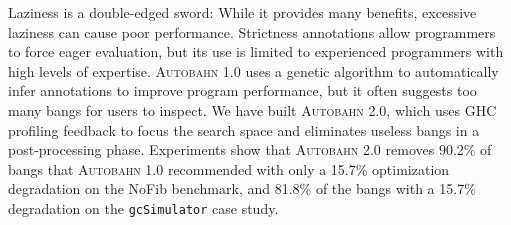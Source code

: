\documentclass[format=sigplan, review=true, 9pt]{acmart}
\newcommand{\useless}[0]{useless}
\newcommand{\Ao}[0]{\textsc{Autobahn 1.0}}
\newcommand{\At}[0]{\textsc{Autobahn 2.0}}
\begin{document}
Laziness is a double-edged sword: While it provides many benefits,
excessive laziness can cause poor performance. Strictness annotations
allow programmers to force eager evaluation, but its use is limited to
experienced programmers with high levels of expertise. \Ao{} uses a
genetic algorithm to automatically infer annotations to improve
program performance, but it often suggests too many bangs for users to
inspect. We have built \At{}, which uses GHC profiling feedback to
focus the search space and eliminates \useless{} bangs in a
post-processing phase.  Experiments show
that \At{} removes 90.2\% of bangs that \Ao{} recommended with only a
15.7\% optimization degradation on the NoFib benchmark, 
and 81.8\% of the bangs with a 15.7\% degradation 
on the \texttt{gcSimulator} case study.



\end{document}
